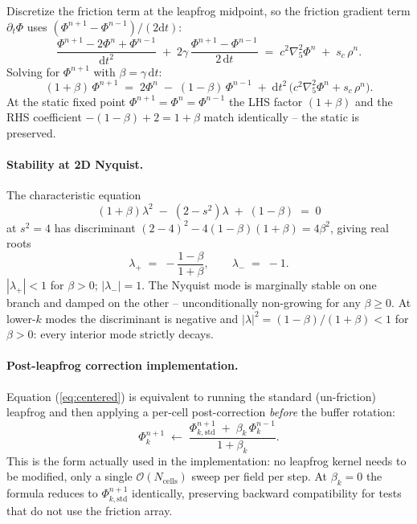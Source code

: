 \documentclass[11pt,a4paper]{article}
\newcommand{\order}[1]{\mathcal{O}(#1)}
\newcommand{\dd}{\mathrm{d}}
\begin{document}
Discretize the friction term at the leapfrog midpoint, so the friction
gradient term $\partial_t \Phi$ uses $(\Phi^{n+1} - \Phi^{n-1})/(2\dd
t)$:
\begin{equation}
  \frac{\Phi^{n+1} - 2\Phi^n + \Phi^{n-1}}{\dd t^2}
  \;+\;
  2\gamma\,\frac{\Phi^{n+1} - \Phi^{n-1}}{2\,\dd t}
  \;=\;
  c^2\nabla^2_5 \Phi^n \;+\; s_c\,\rho^n.
\end{equation}
Solving for $\Phi^{n+1}$ with $\beta = \gamma\,\dd t$:
\begin{equation}
  (1 + \beta)\,\Phi^{n+1} \;=\; 2\Phi^n \;-\; (1-\beta)\,\Phi^{n-1}
  \;+\; \dd t^2\,\bigl(c^2\nabla^2_5 \Phi^n + s_c\,\rho^n\bigr).
  \label{eq:centered}
\end{equation}
At the static fixed point $\Phi^{n+1} = \Phi^n = \Phi^{n-1}$ the
LHS factor $(1+\beta)$ and the RHS coefficient $-(1-\beta) + 2 = 1+\beta$
match identically -- the static is preserved.

\paragraph{Stability at 2D Nyquist.}  The characteristic equation
\begin{equation}
  (1+\beta)\lambda^2 \;-\; (2 - s^2)\lambda \;+\; (1-\beta) \;=\; 0
\end{equation}
at $s^2 = 4$ has discriminant
$(2 - 4)^2 - 4(1-\beta)(1+\beta) = 4\beta^2$, giving real roots
\begin{equation}
  \lambda_+ \;=\; -\frac{1 - \beta}{1 + \beta},
  \qquad
  \lambda_- \;=\; -1.
\end{equation}
$|\lambda_+| < 1$ for $\beta > 0$; $|\lambda_-| = 1$.  The Nyquist
mode is marginally stable on one branch and damped on the other --
unconditionally non-growing for any $\beta \ge 0$.  At lower-$k$ modes
the discriminant is negative and $|\lambda|^2 = (1-\beta)/(1+\beta) <
1$ for $\beta > 0$: every interior mode strictly decays.

\paragraph{Post-leapfrog correction implementation.}  Equation
(\ref{eq:centered}) is equivalent to running the standard (un-friction)
leapfrog and then applying a per-cell post-correction \emph{before}
the buffer rotation:
\begin{equation}
  \Phi^{n+1}_k \;\leftarrow\; \frac{\Phi^{n+1}_{k,\text{std}}
                                    \;+\; \beta_k\,\Phi^{n-1}_k}{1 + \beta_k}.
  \label{eq:centered_post}
\end{equation}
This is the form actually used in the implementation: no leapfrog
kernel needs to be modified, only a single $\order{N_\text{cells}}$
sweep per field per step.  At $\beta_k = 0$ the formula reduces to
$\Phi^{n+1}_{k,\text{std}}$ identically, preserving backward
compatibility for tests that do not use the friction array.
\end{document}
